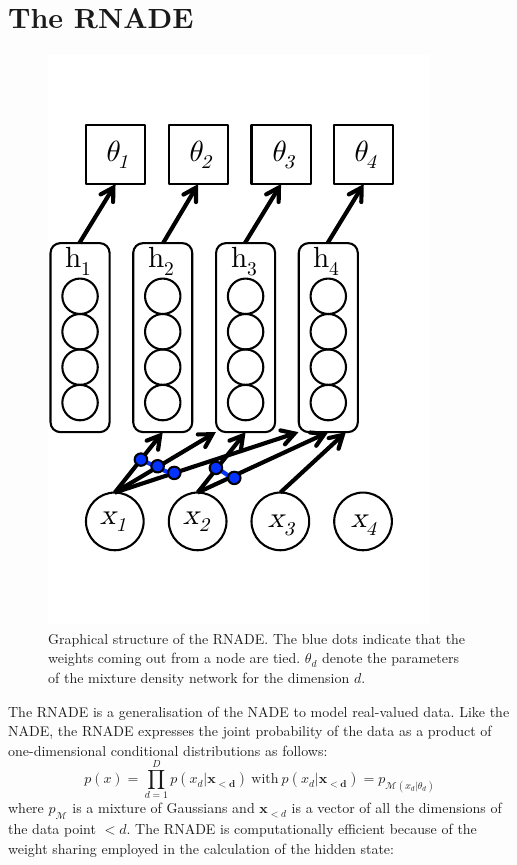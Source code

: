 \documentclass{article} %
\begin{document}
\section{The RNADE}
\label{RNADE}
\begin{figure}
        \centering
    \includegraphics[scale=0.7]{RNADE.pdf}
    \caption{
Graphical structure of the RNADE. The blue dots indicate that the weights coming out from a node are tied. $\theta_{d}$ denote the parameters of the mixture density network for the dimension $d$. }
    \label{fig:rnn-rnade}
\end{figure}


The RNADE is a generalisation of the NADE to model real-valued data. Like the NADE, the RNADE expresses the joint probability of the data as a product of one-dimensional conditional distributions as follows:
$$ p(x) = \prod_{d=1}^{D} p(x_d|\mathbf{x_{<d}}) \: \text{with} \: p(x_d|\mathbf{x_{<d}}) = p_{\mathcal{M}(x_d|\theta_d)} $$ where $p_{\mathcal{M}}$ is a mixture of Gaussians and $\boldsymbol{x}_{<d}$ is a vector of all the dimensions of the data point $<d$. The RNADE is computationally efficient because of the weight sharing employed in the calculation of the hidden state: %
\end{document}
